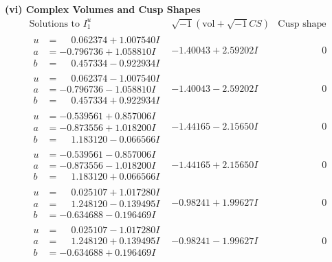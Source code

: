 \documentclass[1p]{elsarticle_modified}
\theoremstyle{definition}
\newcommand{\I}{\sqrt{-1}}
\begin{document}
\newpage\flushleft \textbf{(vi) Complex Volumes and Cusp Shapes}
$$\begin{array}{c|c|c}  
\text{Solutions to }I^u_{1}& \I (\text{vol} + \sqrt{-1}CS) & \text{Cusp shape}\\
 \hline 
\begin{aligned}
u &= \phantom{-}0.062374 + 1.007540 I \\
a &= -0.796736 + 1.058810 I \\
b &= \phantom{-}0.457334 - 0.922934 I\end{aligned}
 & -1.40043 + 2.59202 I & \phantom{-0.000000 } 0 \\ \hline\begin{aligned}
u &= \phantom{-}0.062374 - 1.007540 I \\
a &= -0.796736 - 1.058810 I \\
b &= \phantom{-}0.457334 + 0.922934 I\end{aligned}
 & -1.40043 - 2.59202 I & \phantom{-0.000000 } 0 \\ \hline\begin{aligned}
u &= -0.539561 + 0.857006 I \\
a &= -0.873556 + 1.018200 I \\
b &= \phantom{-}1.183120 - 0.066566 I\end{aligned}
 & -1.44165 - 2.15650 I & \phantom{-0.000000 } 0 \\ \hline\begin{aligned}
u &= -0.539561 - 0.857006 I \\
a &= -0.873556 - 1.018200 I \\
b &= \phantom{-}1.183120 + 0.066566 I\end{aligned}
 & -1.44165 + 2.15650 I & \phantom{-0.000000 } 0 \\ \hline\begin{aligned}
u &= \phantom{-}0.025107 + 1.017280 I \\
a &= \phantom{-}1.248120 - 0.139495 I \\
b &= -0.634688 - 0.196469 I\end{aligned}
 & -0.98241 + 1.99627 I & \phantom{-0.000000 } 0 \\ \hline\begin{aligned}
u &= \phantom{-}0.025107 - 1.017280 I \\
a &= \phantom{-}1.248120 + 0.139495 I \\
b &= -0.634688 + 0.196469 I\end{aligned}
 & -0.98241 - 1.99627 I & \phantom{-0.000000 } 0 \\ \hline\begin{aligned}

\end{aligned}
\end{array}$$
\end{document}
